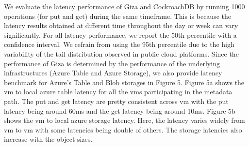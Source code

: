 We evaluate the latency performance of Giza and CockroachDB by running 1000 operations (for put and get) during the same timeframe. This is because the latency results obtained at different time throughout the day or week can vary significantly. For all latency performance, we report the 50th percentile with a confidence interval. We refrain from using the 95th percentile due to the high variability of the tail distribution observed in public cloud platforms. Since the performance of Giza is determined by the performance of the underlying infrastructures (Azure Table and Azure Storage), we also  provide latency benchmark for Azure’s Table and Blob storages in Figure 5. Figure 5a shows the vm to local azure table latency for all the vms participating in the metadata path. The put and get latency are pretty consistent across vm with the put latency being around 60ms and the get latency being around 10ms. Figure 5b shows the vm to local azure storage latency. Here, the latency varies widely from vm to vm with some latencies being double of others. The storage latencies also increase with the object sizes.






